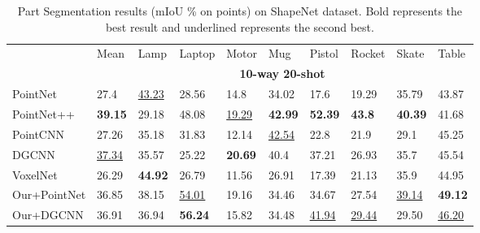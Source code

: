 \documentclass{article}
\begin{document}
\begin{table}[h]
  \caption{Part Segmentation results (mIoU \% on points) on ShapeNet dataset. Bold represents the best result and underlined represents the second best.}
  \label{part6}
  \centering
  \normalsize
  \setlength{\tabcolsep}{4.5pt}
  \begin{tabular}{llllllllll}
    \toprule
    &Mean&Lamp&Laptop&Motor&Mug&Pistol&Rocket&Skate&Table\\
    \cmidrule(r){2-10}
    & \multicolumn{9}{c}{\textbf{10-way 20-shot}}\\
    \cmidrule(r){2-10}
    PointNet &27.4 &\underline{43.23} &28.56 &14.8 &34.02 &17.6 &19.29 &35.79 &43.87\\ 
    PointNet++ &\textbf{39.15} &29.18 &48.08 &\underline{19.29} &\textbf{42.99} &\textbf{52.39} &\textbf{43.8} &\textbf{40.39} &41.68\\
    PointCNN &27.26 &35.18 &31.83 &12.14 &\underline{42.54}&22.8 &21.9 &29.1&45.25\\
    DGCNN & \underline{37.34}&35.57 &25.22 &\textbf{20.69} &40.4 &37.21 &26.93 &35.7 &45.54\\ 
    VoxelNet &26.29 &\textbf{44.92} &26.79 &11.56 &26.91 &17.39 &21.13 &35.9 &44.95\\
    \midrule
    Our+PointNet &36.85 &38.15 &\underline{54.01} &19.16 &34.46 &34.67 &27.54 &\underline{39.14} &\textbf{49.12} \\
    Our+DGCNN &36.91 &36.94&\textbf{56.24}&15.82 &34.48 &\underline{41.94} &\underline{29.44} &29.50 &\underline{46.20} \\
    \bottomrule
  \end{tabular}
\end{table}
\end{document}

